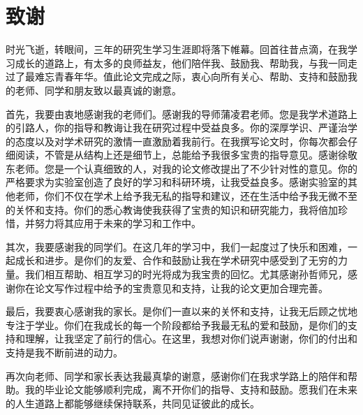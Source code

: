 
\chapter*{致谢}

时光飞逝，转眼间，三年的研究生学习生涯即将落下帷幕。回首往昔点滴，在我学习成长的道路上，有太多的良师益友，他们陪伴我、鼓励我、帮助我，与我一同走过了最难忘青春年华。值此论文完成之际，衷心向所有关心、帮助、支持和鼓励我的老师、同学和朋友致以最真诚的谢意。

首先，我要由衷地感谢我的老师们。感谢我的导师蒲凌君老师。您是我学术道路上的引路人，你的指导和教诲让我在研究过程中受益良多。你的深厚学识、严谨治学的态度以及对学术研究的激情一直激励着我前行。在我撰写论文时，你每次都会仔细阅读，不管是从结构上还是细节上，总能给予我很多宝贵的指导意见。感谢徐敬东老师。您是一个认真细致的人，对我的论文修改提出了不少针对性的意见。你的严格要求为实验室创造了良好的学习和科研环境，让我受益良多。感谢实验室的其他老师，你们不仅在学术上给予我无私的指导和建议，还在生活中给予我无微不至的关怀和支持。你们的悉心教诲使我获得了宝贵的知识和研究能力，我将倍加珍惜，并努力将其应用于未来的学习和工作中。

其次，我要感谢我的同学们。在这几年的学习中，我们一起度过了快乐和困难，一起成长和进步。是你们的友爱、合作和鼓励让我在学术研究中感受到了无穷的力量。我们相互帮助、相互学习的时光将成为我宝贵的回忆。尤其感谢孙哲师兄，感谢你在论文写作过程中给予的宝贵意见和支持，让我的论文更加合理完善。

最后，我要衷心感谢我的家长。是你们一直以来的关怀和支持，让我无后顾之忧地专注于学业。你们在我成长的每一个阶段都给予我最无私的爱和鼓励，是你们的支持和理解，让我坚定了前行的信心。在这里，我想对你们说声谢谢，你们的付出和支持是我不断前进的动力。

再次向老师、同学和家长表达我最真挚的谢意，感谢你们在我求学路上的陪伴和帮助。我的毕业论文能够顺利完成，离不开你们的指导、支持和鼓励。愿我们在未来的人生道路上都能够继续保持联系，共同见证彼此的成长。
